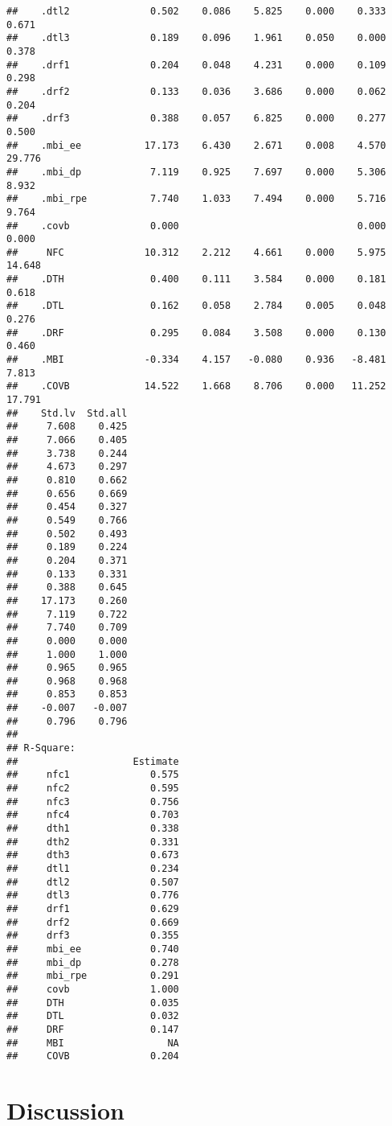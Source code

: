 \documentclass[
  english,
  man]{apa6}
\begin{document}
\begin{verbatim}
##    .dtl2              0.502    0.086    5.825    0.000    0.333    0.671
##    .dtl3              0.189    0.096    1.961    0.050    0.000    0.378
##    .drf1              0.204    0.048    4.231    0.000    0.109    0.298
##    .drf2              0.133    0.036    3.686    0.000    0.062    0.204
##    .drf3              0.388    0.057    6.825    0.000    0.277    0.500
##    .mbi_ee           17.173    6.430    2.671    0.008    4.570   29.776
##    .mbi_dp            7.119    0.925    7.697    0.000    5.306    8.932
##    .mbi_rpe           7.740    1.033    7.494    0.000    5.716    9.764
##    .covb              0.000                               0.000    0.000
##     NFC              10.312    2.212    4.661    0.000    5.975   14.648
##    .DTH               0.400    0.111    3.584    0.000    0.181    0.618
##    .DTL               0.162    0.058    2.784    0.005    0.048    0.276
##    .DRF               0.295    0.084    3.508    0.000    0.130    0.460
##    .MBI              -0.334    4.157   -0.080    0.936   -8.481    7.813
##    .COVB             14.522    1.668    8.706    0.000   11.252   17.791
##    Std.lv  Std.all
##     7.608    0.425
##     7.066    0.405
##     3.738    0.244
##     4.673    0.297
##     0.810    0.662
##     0.656    0.669
##     0.454    0.327
##     0.549    0.766
##     0.502    0.493
##     0.189    0.224
##     0.204    0.371
##     0.133    0.331
##     0.388    0.645
##    17.173    0.260
##     7.119    0.722
##     7.740    0.709
##     0.000    0.000
##     1.000    1.000
##     0.965    0.965
##     0.968    0.968
##     0.853    0.853
##    -0.007   -0.007
##     0.796    0.796
## 
## R-Square:
##                    Estimate
##     nfc1              0.575
##     nfc2              0.595
##     nfc3              0.756
##     nfc4              0.703
##     dth1              0.338
##     dth2              0.331
##     dth3              0.673
##     dtl1              0.234
##     dtl2              0.507
##     dtl3              0.776
##     drf1              0.629
##     drf2              0.669
##     drf3              0.355
##     mbi_ee            0.740
##     mbi_dp            0.278
##     mbi_rpe           0.291
##     covb              1.000
##     DTH               0.035
##     DTL               0.032
##     DRF               0.147
##     MBI                  NA
##     COVB              0.204
\end{verbatim}

\hypertarget{discussion}{%
\section{Discussion}\label{discussion}}
\end{document}
